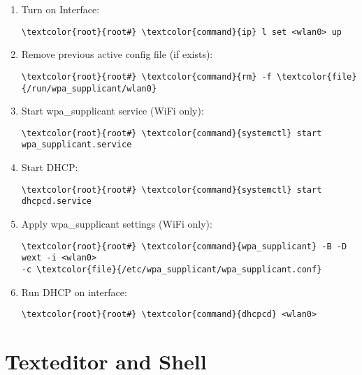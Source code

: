 \documentclass[10pt, a4paper, onecolumn, openany]{book} %
\begin{document}
\begin{enumerate}
    \item Turn on Interface:
\begin{Verbatim}[commandchars=\\\{\}]
\textcolor{root}{root#} \textcolor{command}{ip} l set <wlan0> up
\end{Verbatim}
    \item Remove previous active config file (if exists):
\begin{Verbatim}[commandchars=\\\{\}]
\textcolor{root}{root#} \textcolor{command}{rm} -f \textcolor{file}{/run/wpa_supplicant/wlan0}
\end{Verbatim}
    \item Start wpa\_supplicant service (WiFi only):
\begin{Verbatim}[commandchars=\\\{\}]
\textcolor{root}{root#} \textcolor{command}{systemctl} start wpa_supplicant.service
\end{Verbatim}
    \item Start DHCP:
\begin{Verbatim}[commandchars=\\\{\}]
\textcolor{root}{root#} \textcolor{command}{systemctl} start dhcpcd.service
\end{Verbatim}
    \item Apply wpa\_supplicant settings (WiFi only):
\begin{Verbatim}[commandchars=\\\{\}]
\textcolor{root}{root#} \textcolor{command}{wpa_supplicant} -B -D wext -i <wlan0>
-c \textcolor{file}{/etc/wpa_supplicant/wpa_supplicant.conf}
\end{Verbatim}
    \item Run DHCP on interface:
\begin{Verbatim}[commandchars=\\\{\}]
\textcolor{root}{root#} \textcolor{command}{dhcpcd} <wlan0>
\end{Verbatim}
\end{enumerate}
\chapter{Texteditor and Shell}
\end{document}
